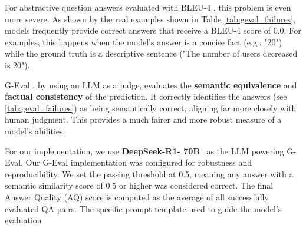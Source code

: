 \noindent For abstractive question answers evaluated with BLEU-4 \cite{papineni-etal-2002-bleu}, this problem is even more severe. As shown by the real examples shown in Table \ref{tab:geval_failures}, models frequently provide correct answers that receive a BLEU-4 score of 0.0. 
For examples, this happens when the model's answer is a concise fact (e.g., "20") while the ground truth is a descriptive sentence ("The number of users decreased is 20").

\noindent G-Eval \cite{liu2023geval}, by using an LLM as a judge, evaluates the \textbf{semantic equivalence} and \textbf{factual consistency} of the prediction. It correctly identifies the answers (see \cref{tab:geval_failures}) as being semantically correct, aligning far more closely with human judgment. This provides a much fairer and more robust measure of a model's abilities.


\noindent For our implementation, we use \textbf{DeepSeek-R1- 70B}~\cite{deepseekai2025deepseekr1incentivizingreasoningcapability} as the LLM powering G-Eval. Our G-Eval implementation was configured for robustness and reproducibility. We set the passing threshold at 0.5, meaning any answer with a semantic similarity score of 0.5 or higher was considered correct. The final Answer Quality (AQ) score is computed as the average of all successfully evaluated QA pairs. The specific prompt template used to guide the model's evaluation 



